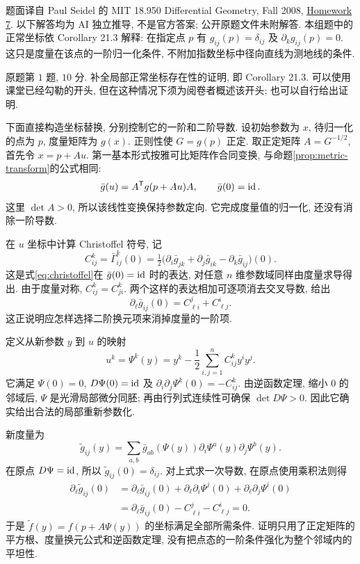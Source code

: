\par{}
题面译自 Paul Seidel 的 MIT 18.950 Differential Geometry, Fall 2008,
\href{https://ocw.mit.edu/courses/18-950-differential-geometry-fall-2008/resources/homework7/}{Homework 7}.
以下解答均为 AI 独立推导, 不是官方答案; 公开原题文件未附解答.
本组题中的正常坐标依 Corollary 21.3 解释: 在指定点 $p$ 有 $g_{ij}(p)=\delta_{ij}$ 及 $\partial_k g_{ij}(p)=0$.
这只是度量在该点的一阶归一化条件, 不附加指数坐标中径向直线为测地线的条件.

\begin{exercise}\label{ps:7-1}
原题第 $1$ 题, $10$ 分. 补全局部正常坐标存在性的证明, 即 Corollary 21.3.
可以使用课堂已经勾勒的开头, 但在这种情况下须为阅卷者概述该开头; 也可以自行给出证明.
\end{exercise}
\begin{solution}
下面直接构造坐标替换, 分别控制它的一阶和二阶导数. 设初始参数为 $x$, 待归一化的点为 $p$, 度量矩阵为 $g(x)$. 正则性使 $G=g(p)$ 正定. 取正定矩阵 $A=G^{-1/2}$, 首先令 $x=p+Au$. 第一基本形式按雅可比矩阵作合同变换, 与命题\ref{prop:metric-transform}的公式相同:
\[
 \bar g(u)=A^{\mathsf T}g(p+Au)A,\qquad \bar g(0)=\operatorname{id}.
\]
这里 $\det A>0$, 所以该线性变换保持参数定向. 它完成度量值的归一化, 还没有消除一阶导数.

在 $u$ 坐标中计算 Christoffel 符号, 记
\[
 C^k_{ij}=\bar\Gamma^k_{ij}(0)
 =\tfrac12\bigl(\partial_i\bar g_{jk}
                 +\partial_j\bar g_{ik}
                 -\partial_k\bar g_{ij}\bigr)(0).
\]
这是式\eqref{eq:christoffel}在 $\bar g(0)=\operatorname{id}$ 时的表达, 对任意 $n$ 维参数域同样由度量求导得出. 由于度量对称, $C^k_{ij}=C^k_{ji}$. 两个这样的表达相加可逐项消去交叉导数, 给出
\[
 \partial_\ell\bar g_{ij}(0)=C^j_{\ell i}+C^i_{\ell j}.
\]
这正说明应怎样选择二阶换元项来消掉度量的一阶项.

定义从新参数 $y$ 到 $u$ 的映射
\[
 u^k=\Psi^k(y)=y^k-\frac12\sum_{i,j=1}^nC^k_{ij}y^iy^j.
\]
它满足 $\Psi(0)=0$, $D\Psi(0)=\operatorname{id}$ 及 $\partial_i\partial_j\Psi^k(0)=-C^k_{ij}$. 由逆函数定理, 缩小 $0$ 的邻域后, $\Psi$ 是光滑局部微分同胚; 再由行列式连续性可确保 $\det D\Psi>0$. 因此它确实给出合法的局部重新参数化.

新度量为
\[
 \widetilde g_{ij}(y)
 =\sum_{a,b}\bar g_{ab}(\Psi(y))\partial_i\Psi^a(y)\partial_j\Psi^b(y).
\]
在原点 $D\Psi=\operatorname{id}$, 所以 $\widetilde g_{ij}(0)=\delta_{ij}$. 对上式求一次导数, 在原点使用乘积法则得
\[
 \begin{aligned}
 \partial_\ell\widetilde g_{ij}(0)
 &=\partial_\ell\bar g_{ij}(0)
   +\partial_\ell\partial_i\Psi^j(0)
   +\partial_\ell\partial_j\Psi^i(0)\\
 &=\partial_\ell\bar g_{ij}(0)-C^j_{\ell i}-C^i_{\ell j}=0.
 \end{aligned}
\]
于是 $\widetilde f(y)=f(p+A\Psi(y))$ 的坐标满足全部所需条件. 证明只用了正定矩阵的平方根、度量换元公式和逆函数定理, 没有把点态的一阶条件强化为整个邻域内的平坦性.
\end{solution}

